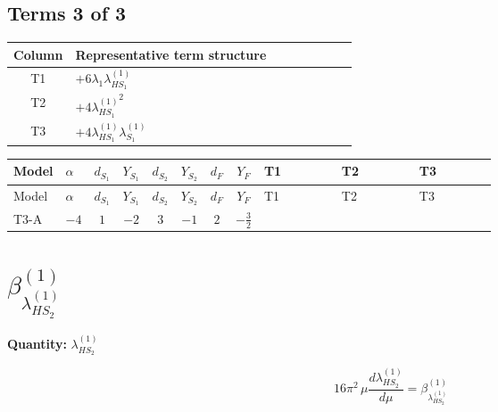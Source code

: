 \documentclass[8pt]{article}
\begin{document}
\begin{landscape}
\subsection*{Terms 3 of 3}
\begin{center}
\begin{tabular}{@{}c >{\raggedright\arraybackslash}p{0.82\linewidth}@{}}
\toprule
Column & Representative term structure \\
\midrule
T1 & \(\displaystyle +6 {\lambda_1} {\lambda_{HS_1}^{(1)}}\) \\
\midrule
T2 & \(\displaystyle +4 {\lambda_{HS_1}^{(1)}}^2\) \\
\midrule
T3 & \(\displaystyle +4 {\lambda_{HS_1}^{(1)}} {\lambda_{S_1}^{(1)}}\) \\
\midrule
\bottomrule
\end{tabular}
\end{center}
\smallskip
\tiny
\begin{longtable}{@{}llcccccc >{\raggedright\arraybackslash}p{0.21\linewidth} >{\raggedright\arraybackslash}p{0.21\linewidth} >{\raggedright\arraybackslash}p{0.21\linewidth}@{}}
\toprule
Model & $\alpha$ & $d_{S_1}$ & $Y_{S_1}$ & $d_{S_2}$ & $Y_{S_2}$ & $d_F$ & $Y_F$ & T1 & T2 & T3 \\
\midrule
\endfirsthead
\toprule
Model & $\alpha$ & $d_{S_1}$ & $Y_{S_1}$ & $d_{S_2}$ & $Y_{S_2}$ & $d_F$ & $Y_F$ & T1 & T2 & T3 \\
\midrule
\endhead
T3-A & $-4$ & $1$ & $-2$ & $3$ & $-1$ & $2$ & $-\frac{3}{2}$ & \scriptsize\adjustbox{max width=\linewidth}{$\begin{gathered} +6 {\lambda_1} {\lambda_{HS_1}^{(1)}}\end{gathered}$} & \scriptsize\adjustbox{max width=\linewidth}{$\begin{gathered} +4 {\lambda_{HS_1}^{(1)}}^2\end{gathered}$} & \scriptsize\adjustbox{max width=\linewidth}{$\begin{gathered} +4 {\lambda_{HS_1}^{(1)}} {\lambda_{S_1}^{(1)}}\end{gathered}$} \\
\midrule
\bottomrule
\end{longtable}
\clearpage
\section*{$\beta_{\lambda_{HS_2}^{(1)}}^{(1)}$}
\noindent\textbf{Quantity: }$\lambda_{HS_2}^{(1)}$\par\smallskip
\[16\pi^2\,\mu\frac{d \lambda_{HS_2}^{(1)}}{d\mu}=\beta_{\lambda_{HS_2}^{(1)}}^{(1)}\]

\end{landscape}
\end{document}
